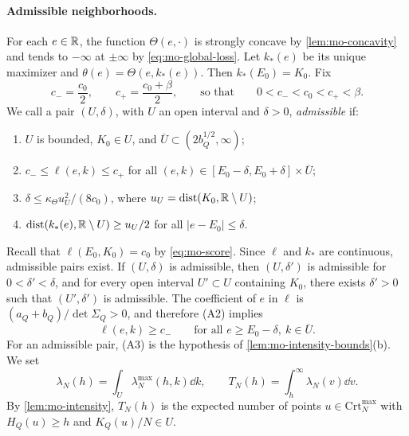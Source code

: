 \paragraph{Admissible neighborhoods.}
For each $e\in\mathbb R$, the function $\Theta(e,\cdot)$ is strongly concave by \cref{lem:mo-concavity} and tends to $-\infty$ at $\pm\infty$ by \eqref{eq:mo-global-loss}. Let $k_*(e)$ be its unique maximizer and $\theta(e)=\Theta(e,k_*(e))$. Then $k_*(E_0)=K_0$. Fix
\begin{equation}\label{eq:mo-cpm}
c_-=\frac{c_0}2,\qquad c_+=\frac{c_0+\beta}2,\qquad\text{so that}\qquad 0<c_-<c_0<c_+<\beta.
\end{equation}
We call a pair $(U,\delta)$, with $U$ an open interval and $\delta>0$, \emph{admissible} if:
\begin{enumerate}
\item[(A1)] $U$ is bounded, $K_0\in U$, and $\overline U\subset(2b_Q^{1/2},\infty)$;
\item[(A2)] $c_-\le\ell(e,k)\le c_+$ for all $(e,k)\in[E_0-\delta,E_0+\delta]\times\overline U$;
\item[(A3)] $\delta\le\kappa_\Theta u_U^2/(8c_0)$, where $u_U=\operatorname{dist}(K_0,\mathbb R\setminus U)$;
\item[(A4)] $\operatorname{dist}(k_*(e),\mathbb R\setminus U)\ge u_U/2$ for all $|e-E_0|\le\delta$.
\end{enumerate}
Recall that $\ell(E_0,K_0)=c_0$ by \eqref{eq:mo-score}. Since $\ell$ and $k_*$ are continuous, admissible pairs exist. If $(U,\delta)$ is admissible, then $(U,\delta')$ is admissible for $0<\delta'<\delta$, and for every open interval $U'\subset U$ containing $K_0$, there exists $\delta'>0$ such that $(U',\delta')$ is admissible. The coefficient of $e$ in $\ell$ is $(a_Q+b_Q)/\det\Sigma_Q>0$, and therefore (A2) implies
\begin{equation}\label{eq:mo-lower-score}
\ell(e,k)\ge c_-\qquad\text{for all }e\ge E_0-\delta,\ k\in\overline U.
\end{equation}
For an admissible pair, (A3) is the hypothesis of \cref{lem:mo-intensity-bounds}(b). We set
\begin{equation}\label{eq:mo-tail-def}
\lambda_N(h)=\int_U\lambda_N^{\max}(h,k)\dd k,\qquad T_N(h)=\int_h^\infty\lambda_N(v)\dd v.
\end{equation}
By \cref{lem:mo-intensity}, $T_N(h)$ is the expected number of points $u\in\mathrm{Crt}_N^{\max}$ with $H_Q(u)\ge h$ and $K_Q(u)/N\in U$.

